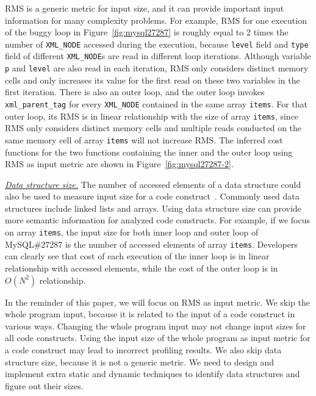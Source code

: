 RMS is a generic metric for input size, 
and it can provide important input information for many complexity problems.   
For example, 
RMS for one execution of
the buggy loop in Figure~\ref{fig:mysql27287}
is roughly equal to 2 times the number of \texttt{XML\_NODE} 
accessed during the execution, 
because \texttt{level} field and \texttt{type} field of 
different \texttt{XML\_NODE}s are read in different loop iterations.
Although variable \texttt{p} and \texttt{level} are also read in each iteration,
RMS only considers distinct memory cells and 
only increases its value for the first read on these two variables in the first iteration. 
There is also an outer loop, 
and the outer loop invokes \texttt{xml\_parent\_tag} 
for every \texttt{XML\_NODE} contained
in the same array \texttt{items}. 
For that outer loop, its RMS is in linear relationship 
with the size of array \texttt{items}, 
since RMS only considers distinct memory cells 
and multiple reads conducted on the same memory 
cell of array \texttt{items} will not increase RMS. 
The inferred cost functions for the two functions 
containing the inner and the outer loop using RMS as input metric are shown 
in Figure~\ref{fig:mysql27287-2}.

{\underline{\textit{Data structure size.}}}
The number of accessed elements of a data 
structure could also be used to measure 
input size for a code construct~\cite{AlgoProf}. 
Commonly used data structures include linked lists and arrays.
Using data structure size can provide more semantic information for 
analyzed code constructs.
For example, if we focus on array \texttt{items}, 
the input size for both 
inner loop and outer loop of MySQL\#27287 is 
the number of accessed elements of array \texttt{items}.
Developers can clearly see that cost of each execution 
of the inner loop is in linear relationship with accessed elements, 
while the cost of the outer loop is in $O(N^2)$ relationship. 

In the reminder of this paper, we will focus on RMS as input metric. 
We skip the whole program input, 
because it is related to the input of a code construct in various ways.
Changing the whole program input may not change input sizes for 
all code constructs. 
Using the input size of the whole program as input metric for a code construct
may lead to incorrect profiling results. 
We also skip data structure size,
because it is not a generic metric. 
We need to design and implement extra static and dynamic techniques 
to identify data structures and figure out their sizes.



